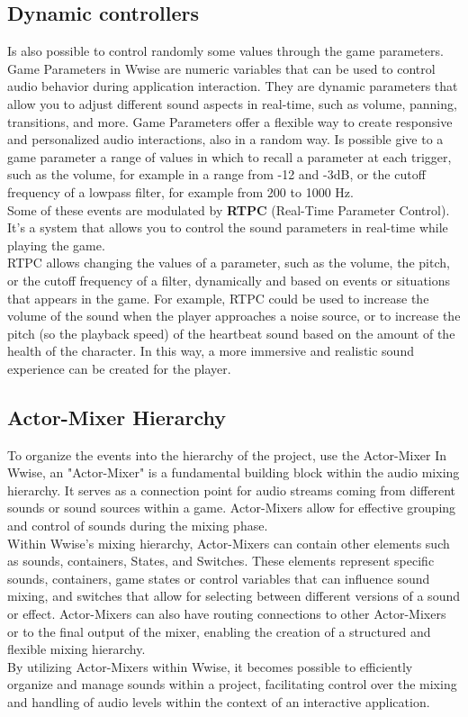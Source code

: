 	\subsection{Dynamic controllers}
	Is also possible to control randomly some values through the game parameters.
	Game Parameters in Wwise are numeric variables that can be used to control audio behavior during application interaction. They are dynamic parameters that allow you to adjust different sound aspects in real-time, such as volume, panning, transitions, and more. Game Parameters offer a flexible way to create responsive and personalized audio interactions, also in a random way. Is possible give to a game parameter a range of values ​​in which to recall a parameter at each trigger, such as the volume, for example in a range from -12 and -3dB, or the cutoff frequency of a lowpass filter, for example from 200 to 1000 Hz. \\
	Some of these events are modulated by \textbf{RTPC} (Real-Time Parameter Control). It's a system that allows you to control the sound parameters in real-time while playing the game. \\
	RTPC allows changing the values ​​of a parameter, such as the volume, the pitch, or the cutoff frequency of a filter, dynamically and based on events or situations that appears in the game. For example, RTPC could be used to increase the volume of the sound when the player approaches a noise source, or to increase the pitch (so the playback speed) of the heartbeat sound based on the amount of the health of the character. In this way, a more immersive and realistic sound experience can be created for the player.

	\subsection{Actor-Mixer Hierarchy}
	To organize the events into the hierarchy of the project, use the Actor-Mixer
	In Wwise, an "Actor-Mixer" is a fundamental building block within the audio mixing hierarchy. It serves as a connection point for audio streams coming from different sounds or sound sources within a game. Actor-Mixers allow for effective grouping and control of sounds during the mixing phase. \\
	Within Wwise's mixing hierarchy, Actor-Mixers can contain other elements such as sounds, containers, States, and Switches. These elements represent specific sounds, containers, game states or control variables that can influence sound mixing, and switches that allow for selecting between different versions of a sound or effect.
	Actor-Mixers can also have routing connections to other Actor-Mixers or to the final output of the mixer, enabling the creation of a structured and flexible mixing hierarchy. \\
	By utilizing Actor-Mixers within Wwise, it becomes possible to efficiently organize and manage sounds within a project, facilitating control over the mixing and handling of audio levels within the context of an interactive application.

